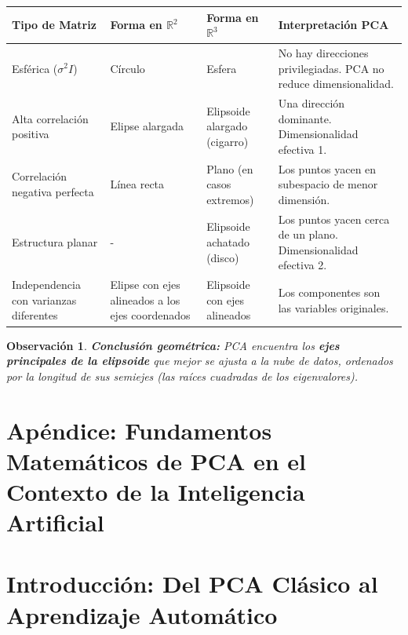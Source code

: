 \documentclass[11pt]{article}
\theoremstyle{plain}
\newtheorem{remark}[theorem]{Observación}
\begin{document}
\begin{center}
\begin{tabular}{|m{3.5cm}|m{3cm}|m{3cm}|m{3cm}|}
\hline
\textbf{Tipo de Matriz} & \textbf{Forma en \(\mathbb{R}^2\)} & \textbf{Forma en \(\mathbb{R}^3\)} & \textbf{Interpretación PCA} \\
\hline
Esférica (\(\sigma^2 I\)) & Círculo & Esfera & No hay direcciones privilegiadas. PCA no reduce dimensionalidad. \\
\hline
Alta correlación positiva & Elipse alargada & Elipsoide alargado (cigarro) & Una dirección dominante. Dimensionalidad efectiva 1. \\
\hline
Correlación negativa perfecta & Línea recta & Plano (en casos extremos) & Los puntos yacen en subespacio de menor dimensión. \\
\hline
Estructura planar & - & Elipsoide achatado (disco) & Los puntos yacen cerca de un plano. Dimensionalidad efectiva 2. \\
\hline
Independencia con varianzas diferentes & Elipse con ejes alineados a los ejes coordenados & Elipsoide con ejes alineados & Los componentes son las variables originales. \\
\hline
\end{tabular}
\end{center}

\begin{remark}
\textbf{Conclusión geométrica:} PCA encuentra los \textbf{ejes principales de la elipsoide} que mejor se ajusta a la nube de datos, ordenados por la longitud de sus semiejes (las raíces cuadradas de los eigenvalores).
\end{remark}

\appendix
\section*{Apéndice: Fundamentos Matemáticos de PCA en el Contexto de la Inteligencia Artificial}
\setcounter{section}{0} %
\renewcommand{\thesection}{A.\arabic{section}} %
\setcounter{equation}{0} %

\section{Introducción: Del PCA Clásico al Aprendizaje Automático}
\end{document}
